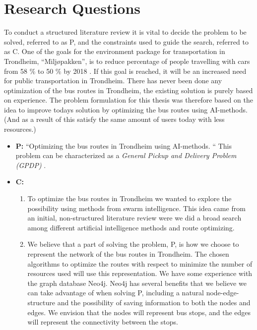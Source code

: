 \section{Research Questions}
To conduct a structured literature review it is vital to decide the problem to be solved, referred to as P, and the constraints used to guide the search, referred to as C.
\newline
\newline
One of the goals for the environment package for transportation in Trondheim, ``Miljøpakken'', is to reduce percentage of people travelling with cars from 58 \% to 50 \% by 2018 \citep{website:miljopakken}. If this goal is reached, it will be an increased need for public transportation in Trondheim. There has never been done any optimization of the bus routes in Trondheim, the existing solution is purely based on experience. The problem formulation for this thesis was therefore based on the idea to improve todays solution by optimizing the bus routes using AI-methods. (And as a result of this satisfy the same amount of users today with less resources.)

\begin{itemize}
\item \textbf{P:} “Optimizing the bus routes in Trondheim using AI-methods. “ This problem can be characterized as a \textit{General Pickup and Delivery Problem (GPDP)} \citep[p.22-25]{vehiclerouting}.  
\item \textbf{C:} 
    \begin{enumerate}
        \item To optimize the bus routes in Trondheim we wanted to explore the possibility using methods from swarm intelligence. This idea came from an initial, non-structured literature review were we did a broad search among different artificial intelligence methods and route optimizing. %
        \item We believe that a part of solving the problem, P, is how we choose to represent the network of the bus routes in Trondheim. The chosen algorithms to optimize the routes with respect to minimize the number of resources used will use this representation. We have some experience with the graph database Neo4j. Neo4j has several benefits that we believe we can take advantage of when solving P, including a natural node-edge-structure and the possibility of saving information to both the nodes and edges. We envision that the nodes will represent bus stops, and the edges will represent the connectivity between the stops. 
    \end{enumerate}
\end{itemize}

